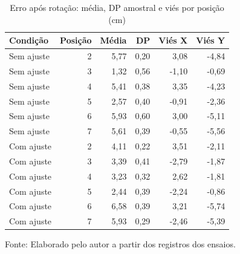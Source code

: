 \begin{table}[H]\centering
\caption{Erro após rotação: média, DP amostral e viés por posição (cm)}\label{tab:reanalise-rotacao}
\small\begin{tabular}{lrrrrr}\toprule
Condição & Posição & Média & DP & Viés X & Viés Y\\\midrule
Sem ajuste & 2 & 5,77 & 0,20 & 3,08 & -4,84\\
Sem ajuste & 3 & 1,32 & 0,56 & -1,10 & -0,69\\
Sem ajuste & 4 & 5,41 & 0,38 & 3,35 & -4,23\\
Sem ajuste & 5 & 2,57 & 0,40 & -0,91 & -2,36\\
Sem ajuste & 6 & 5,93 & 0,60 & 3,00 & -5,11\\
Sem ajuste & 7 & 5,61 & 0,39 & -0,55 & -5,56\\
Com ajuste & 2 & 4,11 & 0,22 & 3,51 & -2,11\\
Com ajuste & 3 & 3,39 & 0,41 & -2,79 & -1,87\\
Com ajuste & 4 & 3,23 & 0,32 & 2,62 & -1,81\\
Com ajuste & 5 & 2,44 & 0,39 & -2,24 & -0,86\\
Com ajuste & 6 & 6,58 & 0,39 & 3,21 & -5,74\\
Com ajuste & 7 & 5,93 & 0,29 & -2,46 & -5,39\\
\bottomrule\end{tabular}\par\smallskip
{\footnotesize Fonte: Elaborado pelo autor a partir dos registros dos ensaios.}\end{table}
